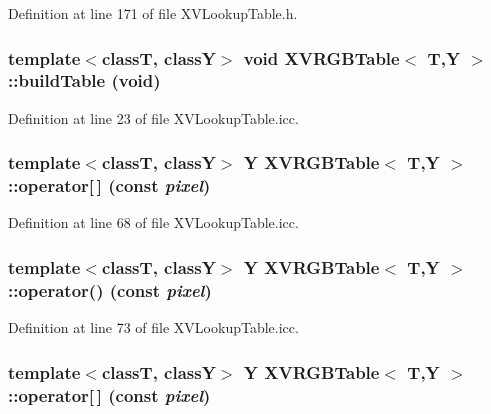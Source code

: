 Definition at line 171 of file XVLookup\-Table.h.\label{XVRGBTable_a1}
\hypertarget{class_XVRGBTable_a1}{
\subsubsection[buildTable]{\setlength{\rightskip}{0pt plus 5cm}template$<$classT, classY$>$ void XVRGBTable$<$ T,Y $>$::build\-Table (void)}}




Definition at line 23 of file XVLookup\-Table.icc.\label{XVRGBTable_a2}
\hypertarget{class_XVRGBTable_a2}{
\subsubsection[operator{}]{\setlength{\rightskip}{0pt plus 5cm}template$<$classT, classY$>$ Y XVRGBTable$<$ T,Y $>$::operator\mbox{[}$\,$\mbox{]} (const {\em pixel})}}




Definition at line 68 of file XVLookup\-Table.icc.\label{XVRGBTable_a3}
\hypertarget{class_XVRGBTable_a3}{
\subsubsection[operator()]{\setlength{\rightskip}{0pt plus 5cm}template$<$classT, classY$>$ Y XVRGBTable$<$ T,Y $>$::operator() (const {\em pixel})}}




Definition at line 73 of file XVLookup\-Table.icc.\label{XVRGBTable_a4}
\hypertarget{class_XVRGBTable_a4}{
\subsubsection[operator{}]{\setlength{\rightskip}{0pt plus 5cm}template$<$classT, classY$>$ Y XVRGBTable$<$ T,Y $>$::operator\mbox{[}$\,$\mbox{]} (const {\em pixel})}}




